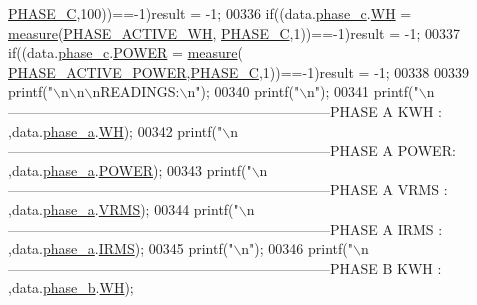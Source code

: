 \begin{DoxyCode}
      \hyperlink{a00042_a3ceb83fb10c2af19b468d508448f24e2}{PHASE\_C},100))==-1)result = -1;
00336          \textcolor{keywordflow}{if}((data.\hyperlink{a00028_ad8892f27909cf51f7603adfc00d224df}{phase\_c}.\hyperlink{a00029_a8dd6d8406db4e214238b3eff481e4ea0}{WH}           = \hyperlink{a00008_gac914ebaa64afce03ee852af09659cf69}{measure}(\hyperlink{a00042_a4ee773ad07fa969b9990f9bb3a1a2093}{PHASE\_ACTIVE\_WH},
      \hyperlink{a00042_a3ceb83fb10c2af19b468d508448f24e2}{PHASE\_C},1))==-1)result = -1;
00337          \textcolor{keywordflow}{if}((data.\hyperlink{a00028_ad8892f27909cf51f7603adfc00d224df}{phase\_c}.\hyperlink{a00029_a8a9794fa4c6a69b457d1eb04b017ef1e}{POWER}         = \hyperlink{a00008_gac914ebaa64afce03ee852af09659cf69}{measure}(
      \hyperlink{a00042_abd3f95c7cd63d0627552d293bf49e026}{PHASE\_ACTIVE\_POWER},\hyperlink{a00042_a3ceb83fb10c2af19b468d508448f24e2}{PHASE\_C},1))==-1)result = -1;
00338          
00339         printf(\textcolor{stringliteral}{"\(\backslash\)n\(\backslash\)n\(\backslash\)nREADINGS:\(\backslash\)n"});
00340         printf(\textcolor{stringliteral}{"\(\backslash\)n"});       
00341         printf(\textcolor{stringliteral}{"\(\backslash\)n---------------------------------------------------------------------PHASE A KWH  : %
      ,data.\hyperlink{a00028_ad7205e9853a503d2fab0697f5a301f6c}{phase\_a}.\hyperlink{a00029_a8dd6d8406db4e214238b3eff481e4ea0}{WH});
00342         printf(\textcolor{stringliteral}{"\(\backslash\)n---------------------------------------------------------------------PHASE A POWER: %
      ,data.\hyperlink{a00028_ad7205e9853a503d2fab0697f5a301f6c}{phase\_a}.\hyperlink{a00029_a8a9794fa4c6a69b457d1eb04b017ef1e}{POWER});
00343         printf(\textcolor{stringliteral}{"\(\backslash\)n---------------------------------------------------------------------PHASE A VRMS : %
      ,data.\hyperlink{a00028_ad7205e9853a503d2fab0697f5a301f6c}{phase\_a}.\hyperlink{a00029_a08415029e214174a01bc6487ff98ee9b}{VRMS});
00344         printf(\textcolor{stringliteral}{"\(\backslash\)n---------------------------------------------------------------------PHASE A IRMS : %
      ,data.\hyperlink{a00028_ad7205e9853a503d2fab0697f5a301f6c}{phase\_a}.\hyperlink{a00029_a4f87f30b543e89e2e5dfa1b8f3f58eff}{IRMS});
00345         printf(\textcolor{stringliteral}{"\(\backslash\)n"});
00346         printf(\textcolor{stringliteral}{"\(\backslash\)n---------------------------------------------------------------------PHASE B KWH  : %
      ,data.\hyperlink{a00028_a48734adeb4d59d056b6e39c6e08fe21e}{phase\_b}.\hyperlink{a00029_a8dd6d8406db4e214238b3eff481e4ea0}{WH});
}}}}}
\end{DoxyCode}
